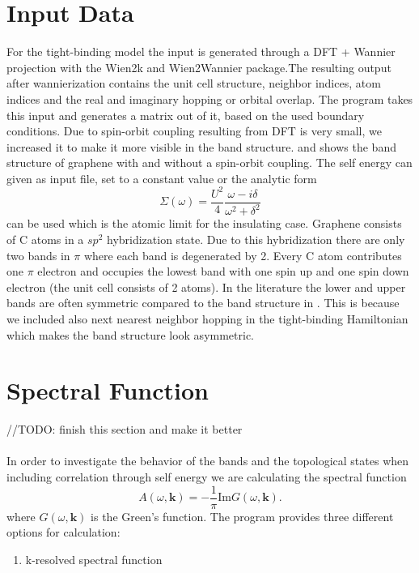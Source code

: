 \documentclass[a4paper,11pt]{report}
\begin{document}
\section{Input Data}

For the tight-binding model the input is generated through a DFT + Wannier projection with the Wien2k and Wien2Wannier package.The resulting output
after wannierization contains the unit cell structure, neighbor indices, atom indices and the real and imaginary hopping or orbital overlap.
The program takes this input and generates a matrix out of it, based on the used boundary conditions. Due to spin-orbit coupling resulting from
DFT is very small, we increased it to make it more visible in the band structure.  and 
shows the band structure of graphene with and without a spin-orbit
coupling.
The self energy can given as input file, set to a constant value or the analytic form
\begin{equation}\label{eq:10}
 \Sigma(\omega) = \frac{U^2}{4}\frac{\omega - i\delta}{\omega^2 + \delta^2}
\end{equation}
can be used which is the atomic limit for the insulating case. Graphene consists of C atoms in a $sp^2$ hybridization state. Due to this
hybridization there are only two bands in  $\pi$ where each band is degenerated by 2. Every C atom contributes one $\pi$ electron
and occupies the lowest band with one spin up and one spin down electron (the unit cell consists of 2 atoms). In the literature the lower and
upper bands are often symmetric compared to the band structure in . This is because we included also next nearest neighbor hopping
in the tight-binding Hamiltonian which makes the band structure look asymmetric. 

\section{Spectral Function}

//TODO: finish this section and make it better\\\\
In order to investigate the behavior of the bands and the topological states when including correlation through self energy we are calculating the 
spectral function
\begin{equation}
 A(\omega,\bm{k}) = -\frac{1}{\pi}\mathrm{Im}G(\omega,\bm{k}).
\end{equation}
where $G(\omega,\bm{k})$ is the Green's function.
The program provides three different options for calculation:
\begin{enumerate}
 \item k-resolved spectral function
\end{enumerate}
\end{document}
